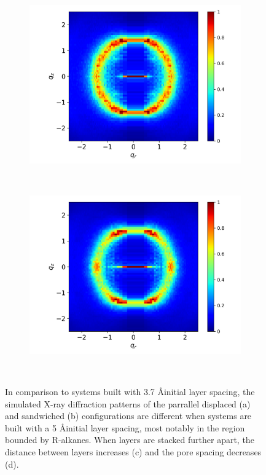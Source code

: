 \documentclass{article}
\begin{document}
\begin{figure}[!hbt]
\begin{subfigure}{0.45\linewidth}
                \caption{}~\label{fig:p2p_disordered}
        \end{subfigure}
        \begin{subfigure}{0.45\linewidth}
                \centering
                \includegraphics[width=\linewidth]{offset_disordered_rzplot.png}
                \caption{}~\label{fig:offset_disordered_xrd}
        \end{subfigure}%
        \begin{subfigure}{0.45\linewidth}
                \centering
                \includegraphics[width=\linewidth]{layered_disordered_rzplot.png}
                \caption{}~\label{fig:layered_disordered_xrd}
        \end{subfigure}
	\caption{In comparison to systems built with 3.7 \AA initial layer spacing,  
                the simulated X-ray diffraction patterns of the parrallel displaced (a) and 
 		sandwiched (b) configurations are different when systems are built with 
 		a 5 \AA initial layer spacing, most notably in the region bounded by R-alkanes.
      		When layers are stacked further apart, the distance between layers increases (c)
                and the pore spacing decreases (d).}
  \end{figure}
\end{document}
